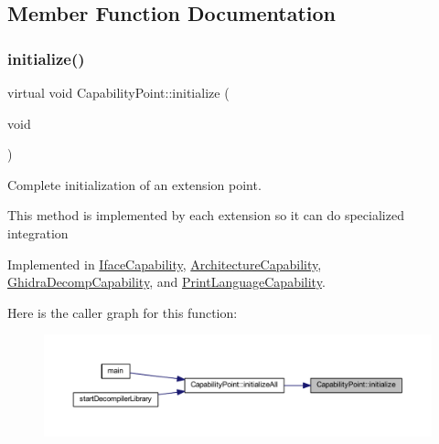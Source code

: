 \subsection{Member Function Documentation}
\mbox{\label{class_capability_point_a493d24125e7e024a9b2d6c2ad4bfbfab}} 
\subsubsection{\texorpdfstring{initialize()}{initialize()}}
{\footnotesize\ttfamily virtual void Capability\+Point\+::initialize (\begin{DoxyParamCaption}\item[{void}]{ }\end{DoxyParamCaption})\hspace{0.3cm}{\ttfamily [pure virtual]}}



Complete initialization of an extension point. 

This method is implemented by each extension so it can do specialized integration 

Implemented in \mbox{\hyperlink{class_iface_capability_a65449e5d8ca98ab3febfa3dd23f451a4}{Iface\+Capability}}, \mbox{\hyperlink{class_architecture_capability_af414aa921939711c0199d02e2ff35e26}{Architecture\+Capability}}, \mbox{\hyperlink{class_ghidra_decomp_capability_a37a40ab02f284b0030fc6c07e0a8da58}{Ghidra\+Decomp\+Capability}}, and \mbox{\hyperlink{class_print_language_capability_ac0c50c753c0e5b11a97ce789f18d33c7}{Print\+Language\+Capability}}.

Here is the caller graph for this function\+:
\nopagebreak
\begin{figure}[H]
\begin{center}
\leavevmode
\includegraphics[width=350pt]{class_capability_point_a493d24125e7e024a9b2d6c2ad4bfbfab_icgraph}
\end{center}
\end{figure}
\mbox{\label{class_capability_point_a4ea216194d3e4cb1f0994dfcbd653a45}} 
